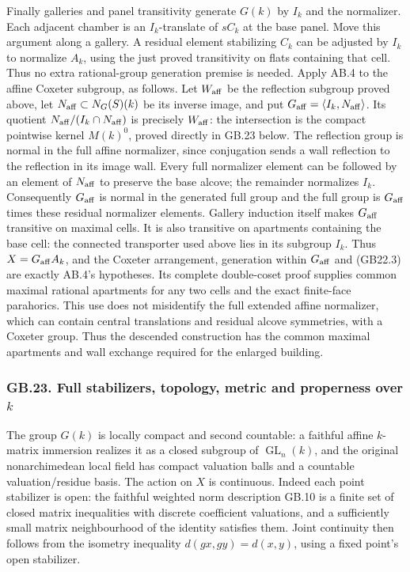 \documentclass[
  11pt,
]{article}
\begin{document}
Finally galleries and panel transitivity generate \(G(k)\) by \(I_k\)
and the normalizer. Each adjacent chamber is an \(I_k\)-translate of
\(sC_k\) at the base panel. Move this argument along a gallery. A
residual element stabilizing \(C_k\) can be adjusted by \(I_k\) to
normalize \(A_k\), using the just proved transitivity on flats
containing that cell. Thus no extra rational-group generation premise is
needed. Apply AB.4 to the affine Coxeter subgroup, as follows. Let
\(W_{\rm aff}\) be the reflection subgroup proved above, let
\(N_{\rm aff}\subset N_G(S)(k)\) be its inverse image, and put
\(G_{\rm aff}=\langle I_k,N_{\rm aff}\rangle\). Its quotient
\(N_{\rm aff}/(I_k\cap N_{\rm aff})\) is precisely \(W_{\rm aff}\): the
intersection is the compact pointwise kernel \(M(k)^0\), proved directly
in GB.23 below. The reflection group is normal in the full affine
normalizer, since conjugation sends a wall reflection to the reflection
in its image wall. Every full normalizer element can be followed by an
element of \(N_{\rm aff}\) to preserve the base alcove; the remainder
normalizes \(I_k\). Consequently \(G_{\rm aff}\) is normal in the
generated full group and the full group is \(G_{\rm aff}\) times these
residual normalizer elements. Gallery induction itself makes
\(G_{\rm aff}\) transitive on maximal cells. It is also transitive on
apartments containing the base cell: the connected transporter used
above lies in its subgroup \(I_k\). Thus \(X=G_{\rm aff}A_k\), and the
Coxeter arrangement, generation within \(G_{\rm aff}\) and (GB22.3) are
exactly AB.4's hypotheses. Its complete double-coset proof supplies
common maximal rational apartments for any two cells and the exact
finite-face parahorics. This use does not misidentify the full extended
affine normalizer, which can contain central translations and residual
alcove symmetries, with a Coxeter group. Thus the descended construction
has the common maximal apartments and wall exchange required for the
enlarged building.

\subsubsection{\texorpdfstring{GB.23. Full stabilizers, topology, metric
and properness over
\(k\)}{GB.23. Full stabilizers, topology, metric and properness over k}}\label{gb.23.-full-stabilizers-topology-metric-and-properness-over-k}

The group \(G(k)\) is locally compact and second countable: a faithful
affine \(k\)-matrix immersion realizes it as a closed subgroup of
\(\operatorname{GL}_n(k)\), and the original nonarchimedean local field
has compact valuation balls and a countable valuation/residue basis. The
action on \(X\) is continuous. Indeed each point stabilizer is open: the
faithful weighted norm description GB.10 is a finite set of closed
matrix inequalities with discrete coefficient valuations, and a
sufficiently small matrix neighbourhood of the identity satisfies them.
Joint continuity then follows from the isometry inequality
\(d(gx,gy)=d(x,y)\), using a fixed point's open stabilizer.
\end{document}
